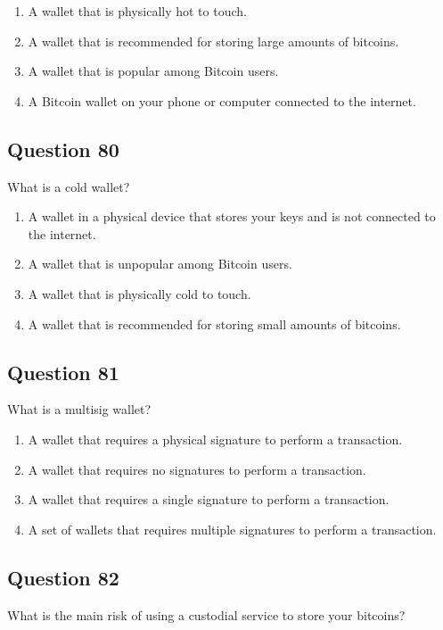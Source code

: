 \documentclass[12pt,a4paper]{article}
\begin{document}
\begin{enumerate}[label=\Alph*., leftmargin=*]
\item A wallet that is physically hot to touch.
\item A wallet that is recommended for storing large amounts of bitcoins.
\item A wallet that is popular among Bitcoin users.
\item A Bitcoin wallet on your phone or computer connected to the internet.
\end{enumerate}

\bigskip


\subsection*{Question 80}
What is a cold wallet?

\begin{enumerate}[label=\Alph*., leftmargin=*]
\item A wallet in a physical device that stores your keys and is not connected to the internet.
\item A wallet that is unpopular among Bitcoin users.
\item A wallet that is physically cold to touch.
\item A wallet that is recommended for storing small amounts of bitcoins.
\end{enumerate}

\bigskip


\subsection*{Question 81}
What is a multisig wallet?

\begin{enumerate}[label=\Alph*., leftmargin=*]
\item A wallet that requires a physical signature to perform a transaction.
\item A wallet that requires no signatures to perform a transaction.
\item A wallet that requires a single signature to perform a transaction.
\item A set of wallets that requires multiple signatures to perform a transaction.
\end{enumerate}

\bigskip


\subsection*{Question 82}
What is the main risk of using a custodial service to store your bitcoins?
\end{document}
